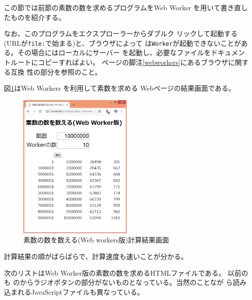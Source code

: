 この節では前節の素数の数を求めるプログラムをWeb Worker を用いて書き直し
 たものを紹介する。

 なお、このプログラムをエクスプローラーからダブルク
 リックして起動する(URLが\texttt{file:}で始まる)と、ブラウザによって
 は\texttt{Worker}が起動できないことがある。その場合にはローカルにサーバー
 を起動し、必要なファイルをドキュメントルートにコピーすればよい。
 \pageref{webworkers}ページの脚注\ref{webworkers}にあるブラウザに関する互換
 性の部分を参照のこと。

   \begin{Exec}\upshape
    図\ref{countPrimes-workers-res}はWeb Workers を利用して素数を求める
    Webページの結果画面である。
    \begin{figure}[ht]
	\begin{center}
	 \includegraphics[width=0.5\textwidth]{primes/countPrimes-workers-res.eps}
	\end{center}
 \caption{素数の数を数える(Web workers版)計算結果画面}\label{countPrimes-workers-res}
 \end{figure}

    計算結果の順がばらばらで、計算速度も速いことが分かる。
    
 次のリストはWeb Worker版の素数の数を求めるHTMLファイルである。
 以前のも のからラジオボタンの部分がないものとなっている。当然のことなが
 ら読み込まれるJavaScriptファイルも異なっている。


\end{Exec}

